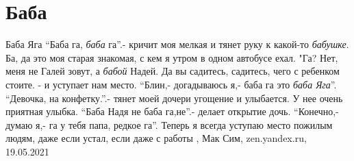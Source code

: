  
 
 
 
 
\chapter{Баба}
\label{sec:slova.baba}

Баба Яга
\enquote{Баба га, \emph{баба} га}.- кричит моя мелкая и тянет руку к какой-то \emph{бабушке}.
Ба, да это моя старая знакомая, с кем я утром в одном автобусе ехал.
"Га? Нет, меня не Галей зовут, а \emph{бабой} Надей. Да вы садитесь, садитесь, чего с ребенком стоите. - и уступает нам место.
\enquote{Блин,- догадываюсь я,- баба га это \emph{баба Яга}}.
\enquote{Девочка, на конфетку.}.- тянет моей дочери угощение и улыбается. У нее очень приятная улыбка.
\enquote{Баба Надя не баба га,не}.- делает открытие дочь.
\enquote{Конечно,- думаю я,- га у тебя папа, редкое га}.
Теперь я всегда уступаю место пожилым людям, даже если устал, если даже с работы
, Мак Сим, zen.yandex.ru, 19.05.2021

